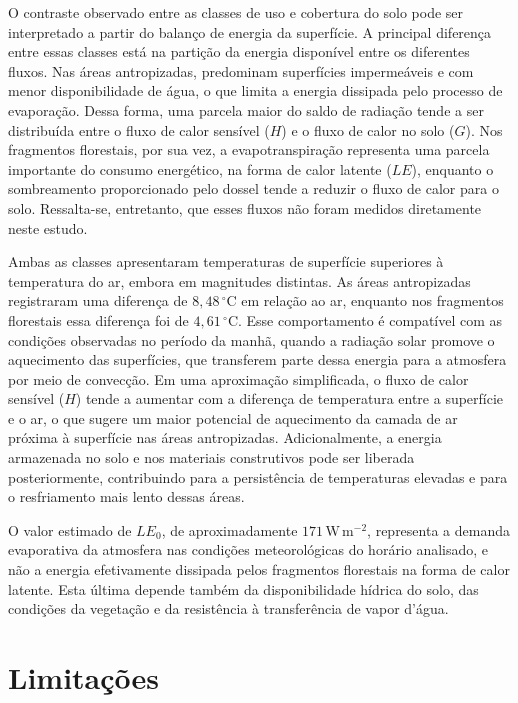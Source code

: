 \documentclass[
12pt,			%
openany,		%
oneside,		%
a4paper,		%
sumario=tradicional,
chapter=TITLE,
section=TITLE,
subsection=Title,
brazil,			%
]{abntex2}
\begin{document}
	O contraste observado entre as classes de uso e cobertura do solo pode ser interpretado a partir do balanço de energia da superfície. A principal diferença entre essas classes está na partição da energia disponível entre os diferentes fluxos. Nas áreas antropizadas, predominam superfícies impermeáveis e com menor disponibilidade de água, o que limita a energia dissipada pelo processo de evaporação. Dessa forma, uma parcela maior do saldo de radiação tende a ser distribuída entre o fluxo de calor sensível ($H$) e o fluxo de calor no solo ($G$). Nos fragmentos florestais, por sua vez, a evapotranspiração representa uma parcela importante do consumo energético, na forma de calor latente ($LE$), enquanto o sombreamento proporcionado pelo dossel tende a reduzir o fluxo de calor para o solo. Ressalta-se, entretanto, que esses fluxos não foram medidos diretamente neste estudo.
	
	Ambas as classes apresentaram temperaturas de superfície superiores à temperatura do ar, embora em magnitudes distintas. As áreas antropizadas registraram uma diferença de $8{,}48\,^{\circ}\mathrm{C}$ em relação ao ar, enquanto nos fragmentos florestais essa diferença foi de $4{,}61\,^{\circ}\mathrm{C}$. Esse comportamento é compatível com as condições observadas no período da manhã, quando a radiação solar promove o aquecimento das superfícies, que transferem parte dessa energia para a atmosfera por meio de convecção. Em uma aproximação simplificada, o fluxo de calor sensível ($H$) tende a aumentar com a diferença de temperatura entre a superfície e o ar, o que sugere um maior potencial de aquecimento da camada de ar próxima à superfície nas áreas antropizadas. Adicionalmente, a energia armazenada no solo e nos materiais construtivos pode ser liberada posteriormente, contribuindo para a persistência de temperaturas elevadas e para o resfriamento mais lento dessas áreas.
	
	O valor estimado de $LE_0$, de aproximadamente $171\,\mathrm{W\,m^{-2}}$, representa a demanda evaporativa da atmosfera nas condições meteorológicas do horário analisado, e não a energia efetivamente dissipada pelos fragmentos florestais na forma de calor latente. Esta última depende também da disponibilidade hídrica do solo, das condições da vegetação e da resistência à transferência de vapor d'água.
	
	\section{Limitações}
	
\end{document}
